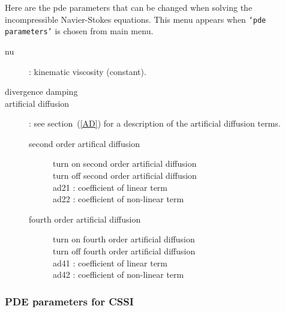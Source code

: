  Here are the pde parameters that can be changed when solving the incompressible Navier-Stokes equations.
 This menu appears when {\tt `pde parameters'} is chosen from main menu.
\begin{description}
  \item[nu] : kinematic viscosity (constant).
  \item[divergence damping]
  \item[artificial diffusion] : see section~(\ref{AD}) for a description of the artificial diffusion terms.
    \begin{description}
      \item[second order artifical diffusion]
        \begin{description}
          \item[turn on second order artificial diffusion]
          \item[turn off second order artificial diffusion]
          \item[ad21 : coefficient of linear term]
          \item[ad22 : coefficient of non-linear term]
        \end{description}
      \item[fourth order artificial diffusion]
        \begin{description}
          \item[turn on fourth order artificial diffusion]
          \item[turn off fourth order artificial diffusion]
          \item[ad41 : coefficient of linear term]
          \item[ad42 : coefficient of non-linear term]
        \end{description}
    \end{description}
  \end{description}

\subsubsection{PDE parameters for CSSI}\label{sec:cssiPdeParams}
 

